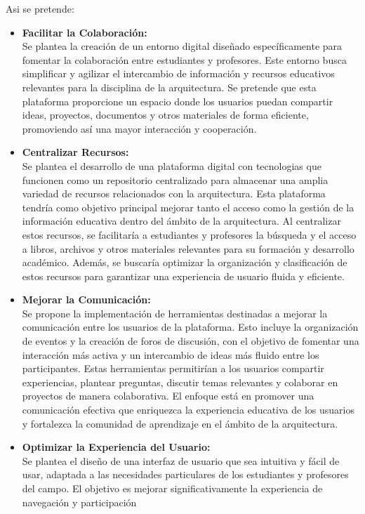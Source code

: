 \documentclass[a4paper, 12pt]{book}
\begin{document}
Asi se pretende: 
\begin{itemize}
  \item \textbf{Facilitar la Colaboración: } \\ 
  Se plantea la creación de un entorno digital diseñado específicamente para fomentar la colaboración entre estudiantes y profesores. Este entorno busca simplificar 
  y agilizar el intercambio de información y recursos educativos relevantes para la disciplina de la arquitectura. Se pretende que esta plataforma proporcione un 
  espacio donde los usuarios puedan compartir ideas, proyectos, documentos y otros materiales de forma eficiente, promoviendo así una mayor interacción y cooperación.
  \item \textbf{Centralizar Recursos: } \\ Se plantea el desarrollo de una plataforma digital con tecnologias que funcionen como un repositorio centralizado para almacenar una 
  amplia variedad de recursos relacionados con la arquitectura. Esta plataforma tendría como objetivo principal mejorar tanto el acceso como la gestión de la 
  información educativa dentro del ámbito de la arquitectura. Al centralizar estos recursos, se facilitaría a estudiantes y profesores la búsqueda y el acceso a 
  libros, archivos y otros materiales relevantes para su formación y desarrollo académico. Además, se buscaría optimizar la organización y clasificación de estos 
  recursos para garantizar una experiencia de usuario fluida y eficiente.
  \item \textbf{Mejorar la Comunicación: } \\ Se propone la implementación de herramientas destinadas a mejorar la comunicación entre los usuarios de la plataforma. 
  Esto incluye la organización de eventos y la creación de foros de discusión, con el objetivo de fomentar una interacción más activa y un intercambio de ideas más 
  fluido entre los participantes. Estas herramientas permitirían a los usuarios compartir experiencias, plantear preguntas, discutir temas relevantes y colaborar en 
  proyectos de manera colaborativa. El enfoque está en promover una comunicación efectiva que enriquezca la experiencia educativa de los usuarios y fortalezca la 
  comunidad de aprendizaje en el ámbito de la arquitectura.
  \item \textbf{Optimizar la Experiencia del Usuario: } \\ Se plantea el diseño de una interfaz de usuario que sea intuitiva y fácil de usar, adaptada a las 
  necesidades particulares de los estudiantes y profesores del campo. El objetivo es mejorar significativamente la experiencia de navegación y participación 

\end{itemize}
\end{document}
